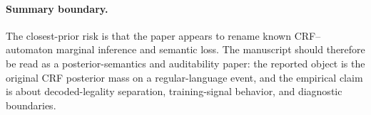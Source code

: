 \paragraph{Summary boundary.}
The closest-prior risk is that the paper appears to rename known CRF--automaton
marginal inference and semantic loss.  The manuscript should therefore be read
as a posterior-semantics and auditability paper: the reported object is the
original CRF posterior mass on a regular-language event, and the empirical
claim is about decoded-legality separation, training-signal behavior, and
diagnostic boundaries.
